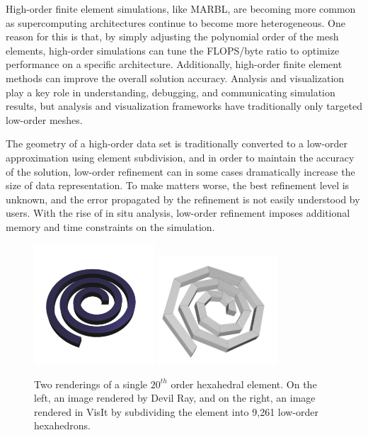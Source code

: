 High-order finite element simulations, like MARBL, are becoming more
common as supercomputing architectures continue to become more
heterogeneous.
%
One reason for this is that, by simply adjusting the polynomial order
of the mesh elements, high-order simulations
can tune the FLOPS/byte ratio to optimize performance on a specific architecture.
%
Additionally, high-order finite element methods can improve the overall solution accuracy.
%
Analysis and visualization play a key role in understanding, debugging,
and communicating simulation results, but analysis and visualization frameworks
have traditionally only targeted low-order meshes.
%

The geometry of a high-order data set is traditionally converted
to a low-order approximation using element subdivision, and in order
to maintain the accuracy of the solution, low-order refinement can
in some cases dramatically increase the size of data representation.
%
To make matters worse, the best refinement level is unknown,
and the error propagated by the refinement is not easily understood by users.
%
With the rise of in situ analysis, low-order refinement imposes additional memory
and time constraints on the simulation.
%

\begin{figure}
\centering
\includegraphics[width=0.4\textwidth]{images/dray_crazy}
\includegraphics[width=0.4\textwidth]{images/visit_crazy}
\caption{\label{img:crazy_hex} Two renderings of a single $20^{th}$ order hexahedral element.
On the left, an image rendered by Devil Ray, and on the right, an image rendered
in VisIt by subdividing the element into
9,261 low-order hexahedrons.}
\end{figure}

